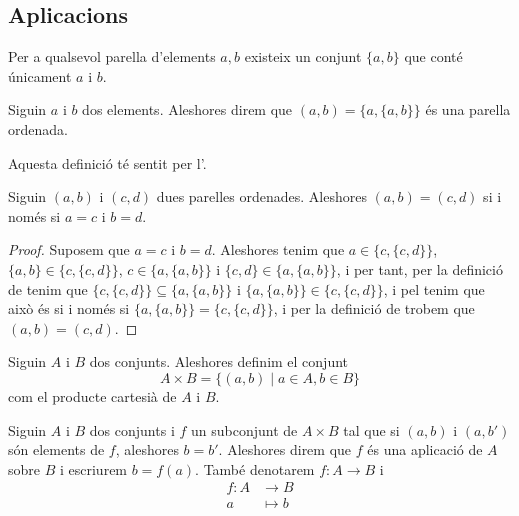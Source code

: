 \documentclass[../../Main.tex]{subfiles}
\begin{document}
	\subsection{Aplicacions}
	\begin{axiom}
		\label{axiom:axioma del parell}
		Per a qualsevol parella d'elements \(a,b\) existeix un conjunt \(\{a,b\}\) que conté únicament \(a\) i \(b\).
	\end{axiom}
	\begin{definition}
		\label{def:parelles ordenades}
		Siguin \(a\) i \(b\) dos elements. Aleshores direm que \((a,b)=\{a,\{a,b\}\}\) és una parella ordenada.
		
		Aquesta definició té sentit per l'.
	\end{definition}
	\begin{proposition}
		\label{prop:parelles ordenades}
		Siguin \((a,b)\) i \((c,d)\) dues parelles ordenades. Aleshores \((a,b)=(c,d)\) si i només si \(a=c\) i \(b=d\).
		\begin{proof}
			Suposem que \(a=c\) i \(b=d\). Aleshores tenim que \(a\in\{c,\{c,d\}\}\), \(\{a,b\}\in\{c,\{c,d\}\}\), \(c\in\{a,\{a,b\}\}\) i \(\{c,d\}\in\{a,\{a,b\}\}\), i per tant, per la definició de  tenim que \(\{c,\{c,d\}\}\subseteq\{a,\{a,b\}\}\) i \(\{a,\{a,b\}\}\in\{c,\{c,d\}\}\), i pel  tenim que això és si i només si \(\{a,\{a,b\}\}=\{c,\{c,d\}\}\), i per la definició de  trobem que \((a,b)=(c,d)\).
		\end{proof}
	\end{proposition}
	\begin{definition}
		\label{def:producte cartesià de conjunts}
		Siguin \(A\) i \(B\) dos conjunts. Aleshores definim el conjunt
		\[A\times B=\{(a,b)\mid a\in A,b\in B\}\]
		com el producte cartesià de \(A\) i \(B\).
	\end{definition}
	\begin{definition}[Aplicació]
		\label{def:aplicació}
		Siguin \(A\) i \(B\) dos conjunts i \(f\) un subconjunt de \(A\times B\) tal que si \((a,b)\) i \((a,b')\) són elements de \(f\), aleshores \(b=b'\). Aleshores direm que \(f\) és una aplicació de \(A\) sobre \(B\) i escriurem \(b=f(a)\). També denotarem \(f\colon A\longrightarrow B\) i
		\begin{align*}
		f\colon A&\longrightarrow B\\
		a&\longmapsto b
		\end{align*}
	\end{definition}
\end{document}
